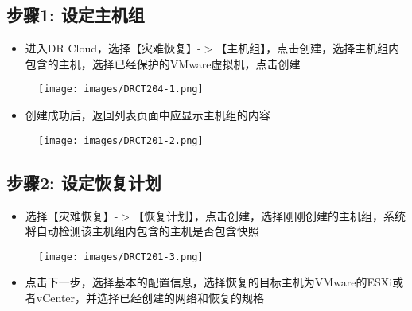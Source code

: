 \subsection{步骤1: 设定主机组}
\label{步骤1:设定主机组}

\begin{itemize}
\item 进入DR Cloud，选择【灾难恢复】-$>$【主机组】，点击创建，选择主机组内包含的主机，选择已经保护的VMware虚拟机，点击创建

\end{itemize}

\begin{figure}[htbp]
\centering
\texttt{[image: images/DRCT204-1.png]}
\end{figure}

\begin{itemize}
\item 创建成功后，返回列表页面中应显示主机组的内容

\end{itemize}

\begin{figure}[htbp]
\centering
\texttt{[image: images/DRCT201-2.png]}
\end{figure}

\subsection{步骤2: 设定恢复计划}
\label{步骤2:设定恢复计划}

\begin{itemize}
\item 选择【灾难恢复】-$>$【恢复计划】，点击创建，选择刚刚创建的主机组，系统将自动检测该主机组内包含的主机是否包含快照

\end{itemize}

\begin{figure}[htbp]
\centering
\texttt{[image: images/DRCT201-3.png]}
\end{figure}

\begin{itemize}
\item 点击下一步，选择基本的配置信息，选择恢复的目标主机为VMware的ESXi或者vCenter，并选择已经创建的网络和恢复的规格

\end{itemize}

